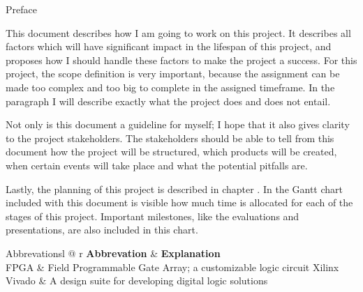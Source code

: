 \documentclass{matthijs}
\begin{document}
	\begin{hoofdstuk}{Preface}

		This document describes how I am going to work on this project.
		It describes all factors which will have significant impact in the lifespan of this project, and proposes how I should handle these factors to make the project a success.
		For this project, the scope definition is very important, because the assignment can be made too complex and too big to complete in the assigned timeframe.
		In the paragraph  I will describe exactly what the project does and does not entail.
		
		Not only is this document a guideline for myself; I hope that it also gives clarity to the project stakeholders.
		The stakeholders should be able to tell from this document how the project will be structured, which products will be created, when certain events will take place and what the potential pitfalls are.

		Lastly, the planning of this project is described in chapter .
		In the Gantt chart included with this document is visible how much time is allocated for each of the stages of this project.
		Important milestones, like the evaluations and presentations, are also included in this chart.
		
		\vspace{16pt}

		\begin{tabel}{Abbrevations}{l @{\extracolsep{\fill}} r}
			\textbf{Abbrevation} & \textbf{Explanation} \\
			\midrule
			FPGA & Field Programmable Gate Array; a customizable logic circuit \tabularnewline
			Xilinx Vivado & A design suite for developing digital logic solutions \tabularnewline
		\end{tabel}

	\end{hoofdstuk}
	
\end{document}
